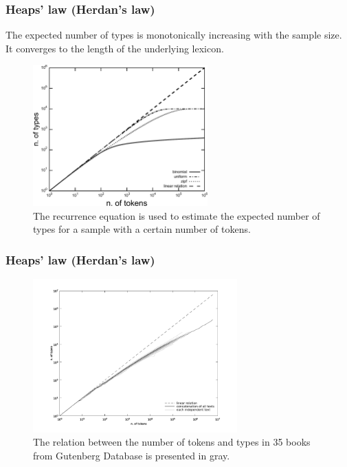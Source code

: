 \documentclass[notes]{beamer}
\begin{document}
\frame
{
  \frametitle{Heaps' law (Herdan's law)}  
  The expected number of types is monotonically increasing with the sample size. 
  It converges to the length of the underlying lexicon.

  \begin{figure}[h]
  \centering
  \includegraphics[width=0.6\textwidth]{images/heapslaw_rdist.pdf}
  \caption{The recurrence equation is used to estimate the expected number of types for a sample with a certain number of tokens.}
  \label{fig:heapslaw_rdist}
  \end{figure} 
}


\frame
{
  \frametitle{Heaps' law (Herdan's law)}
  \vspace{-0.3cm}
  \begin{figure}[h]
  \centering
  \includegraphics[width=0.7\textwidth]{images/heapslawtexts.png}
  \caption{The relation between the number of tokens and types in 35 books from Gutenberg Database is presented in gray.} 
  \label{fig:heapslawtexts}
  \end{figure}
}
\end{document}
